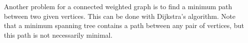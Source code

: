 

\setcounter{section}{2}
\setcounter{subsection}{6}
\setcounter{dfn}{20}

\begin{rem}
Another problem for a connected weighted graph is to find a minimum path between two given vertices.
This can be done with Dijkstra's algorithm.
Note that a minimum spanning tree contains a path between any pair of vertices, but this path is not necessarily minimal.
\end{rem}


